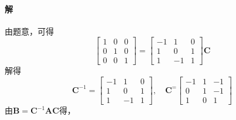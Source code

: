 \documentclass[12pt, a4paper, oneside, fontset=none]{ctexart}
\begin{document}
\paragraph*{解} 由题意，可得
\[
    \begin{bmatrix}
        1 & 0 & 0 \\
        0 & 1 & 0 \\
        0 & 0 & 1
    \end{bmatrix} = \begin{bmatrix}
        -1 & 1  & 0 \\
        1  & 0  & 1 \\
        1  & -1 & 1
    \end{bmatrix} \bm{C}
\]
解得
\[
    \bm{C}^{-1} = \begin{bmatrix}
        -1 & 1  & 0 \\
        1  & 0  & 1 \\
        1  & -1 & 1
    \end{bmatrix}, \quad \bm{C}^ = \begin{bmatrix}
        -1 & 1 & -1 \\
        0  & 1 & -1 \\
        1  & 0 & 1
    \end{bmatrix}
\]
由$\bm{B} = \bm{C}^{-1}\bm{AC}$得，
\end{document}
